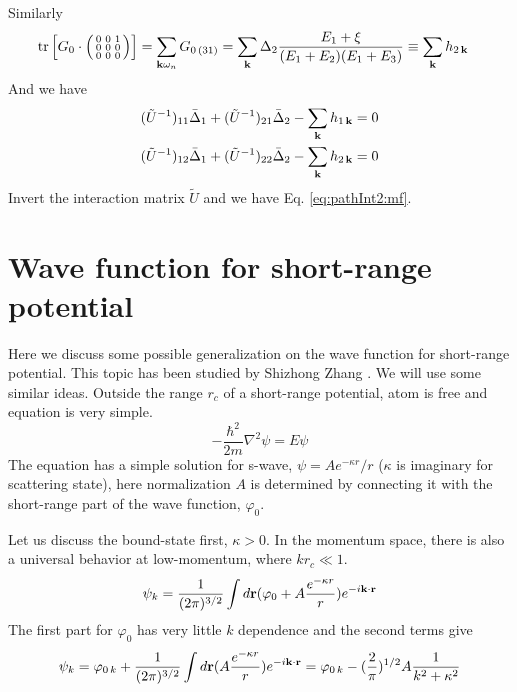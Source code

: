 Similarly
\begin{equation}
\begin{split}
\text{tr}\left[{G_{0}}\cdot\left(\begin{smallmatrix}0&0&1\\0&0&0\\0&0&0\end{smallmatrix}\right)\right]&=\sum_{\mathbf{k}\omega_{n}}G_{0\,(31)}
=\sum_{\mathbf{k}}\Delta_{2}\frac{E_{1}+\xi}{(E_{1}+E_{2})(E_{1}+E_{3})}\equiv\sum_{\mathbf{k}}h_{2\,\mathbf{k}}
\end{split}
\end{equation}
And we have 
 \begin{align*}
(\tilde{U}^{-1})_{11}\bar{\Delta}_{1}+(\tilde{U}^{-1})_{21}\bar{\Delta}_{2}-\sum_{\mathbf{k}}h_{1\,\mathbf{k}}=0\\
(\tilde{U}^{-1})_{12}\bar{\Delta}_{1}+(\tilde{U}^{-1})_{22}\bar{\Delta}_{2}-\sum_{\mathbf{k}}h_{2\,\mathbf{k}}=0
 \end{align*}
Invert the interaction matrix $\tilde{U}$ and we have Eq.  \ref{eq:pathInt2:mf}.


\section{Wave function for short-range potential}\label{sec:pathInt2:short-range}
Here we discuss some possible generalization on the wave function for short-range potential.  This topic has been studied by Shizhong Zhang \cite{shizhongUniv}. We will use some similar ideas.  Outside the range $r_{c}$ of a short-range potential,  atom is free and  \sch equation is very simple.
\begin{equation}
-\frac{\hbar^{2}}{2m}\nabla^{2}\psi=E\psi
\end{equation}
The equation has a simple solution for s-wave, $\psi=A{e^{-\kappa{r}}}/{r}$ ($\kappa$ is imaginary for scattering state), here normalization $A$ is determined  by connecting it with the short-range part of the wave function, $\varphi_0$. 

Let us discuss the bound-state first, $\kappa>0$.  In the momentum space, there is also a universal behavior at low-momentum, where $kr_{c}\ll1$.   
\begin{equation*}
\psi_{k}=\frac{1}{(2\pi)^{3/2}}\int{d\ensuremath{\mathbf{r}}}(\varphi_{0}+A\frac{e^{-\kappa{r}}}{r})e^{-i\mathbf{k}\cdot\mathbf{r}}
\end{equation*}
The first part for $\varphi_{0}$ has very little $k$ dependence and the second terms give
\begin{equation*}
\psi_{k}=\varphi_{0\,k}+\frac{1}{(2\pi)^{3/2}}\int{d\ensuremath{\mathbf{r}}}(A\frac{e^{-\kappa{r}}}{r})e^{-i\mathbf{k}\cdot\mathbf{r}}=\varphi_{0\,k}-(\frac{2}{\pi})^{1/2}A\frac{1}{k^{2}+\kappa^{2}}
\end{equation*}

